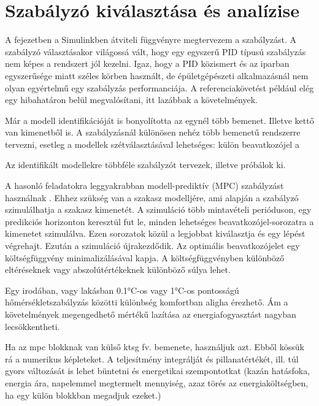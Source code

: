 \chapter{Szabályzó kiválasztása és analízise}\label{chap:control}

A fejezetben a Simulinkben átviteli függvényre megtervezem a szabályzást. A szabályzó választásakor világossá vált, hogy egy egyszerű PID típusú szabályzás nem képes a rendszert jól kezelni. Igaz, hogy a PID közismert és az iparban egyszerűsége miatt széles körben használt, de épületgépészeti alkalmazásnál nem olyan egyértelmű egy szabályzás performanciája. A referenciakövetést például elég egy hibahatáron belül megvalósítani, itt lazábbak a követelmények.


Már a modell identifikációját is bonyolította az egynél több bemenet. Illetve kettő van kimenetből is. A szabályzásnál különösen nehéz több bemenetű rendszerre tervezni, esetleg a modellek szétválasztásával lehetséges: külön beavatkozójel a 


Az identifikált modellekre többféle szabályzót tervezek, illetve próbálok ki.

A hasonló feladatokra leggyakrabban modell-prediktív (MPC) szabályzást használnak \cite{AFRAM2014343}. Ehhez szükség van a szakasz modelljére, ami alapján a szabályzó szimulálhatja a szakasz kimenetét. A szimuláció több mintavételi perióduson, egy predikciós horizonton keresztül fut le, minden lehetséges  beavatkozójel-sorozatra a kimenetet szimulálva.
Ezen sorozatok közül a legjobbat kiválasztja és egy lépést végrehajt. Ezután a szimuláció újrakezdődik. Az optimális beavatkozójelet egy költségfüggvény minimalizálásával kapja. A költségfüggvényben különböző eltéréseknek vagy abszolútértékeknek különböző súlya lehet.

Egy irodában, vagy lakásban 0.1\si{\celsius}-os vagy 1\si{\celsius}-os pontosságú hőmérsékletszabályzás közötti különbség komfortban aligha érezhető. Ám a követelmények megengedhető mértékű lazítása az energiafogyasztást nagyban lecsökkentheti.

\begin{formal}
	Ha az mpc blokknak van külső ktsg fv. bemenete, használjuk azt. Ebből kössük rá a numerikus képleteket. A teljesítmény integrálját és pillanatértékét, ill. túl gyors változását is lehet büntetni és energetikai szempontotkat (kazán hatásfoka, energia ára, napelemmel megtermelt mennyiség, azaz törés az energiaköltségben, ha egy külön blokkban megadjuk ezeket.)
\end{formal}

